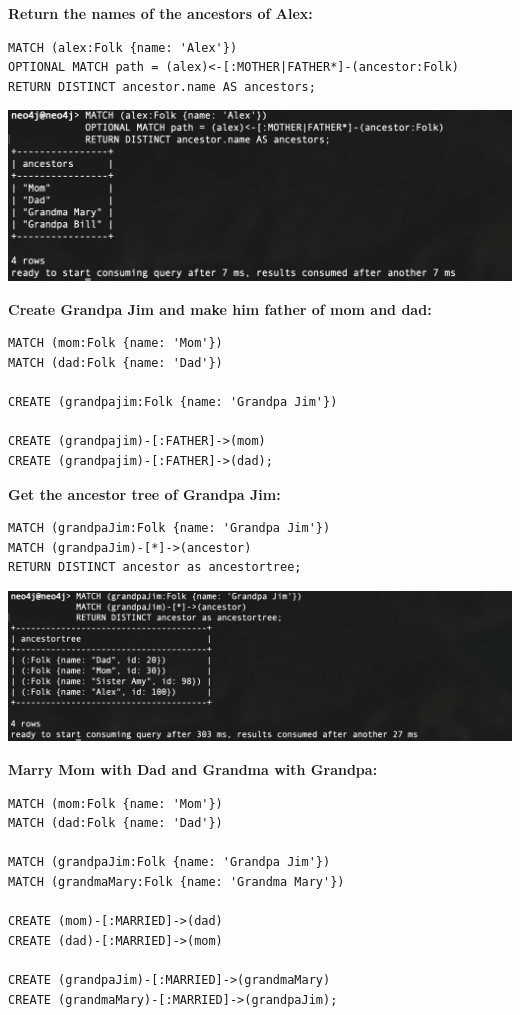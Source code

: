 \documentclass[14pt,a4paper]{extarticle}
\begin{document}
	\noindent \textbf{Return the names of the ancestors of Alex:}
	\begin{lstlisting}[style=sql]
MATCH (alex:Folk {name: 'Alex'})
OPTIONAL MATCH path = (alex)<-[:MOTHER|FATHER*]-(ancestor:Folk)
RETURN DISTINCT ancestor.name AS ancestors;
	\end{lstlisting}
	\includegraphics[width=\textwidth]{images/sc05.png}

	\noindent \textbf{Create Grandpa Jim and make him father of mom and dad:}
	\begin{lstlisting}[style=sql]
MATCH (mom:Folk {name: 'Mom'})
MATCH (dad:Folk {name: 'Dad'})

CREATE (grandpajim:Folk {name: 'Grandpa Jim'})

CREATE (grandpajim)-[:FATHER]->(mom)
CREATE (grandpajim)-[:FATHER]->(dad);
	\end{lstlisting}

	\pagebreak


	\noindent \textbf{Get the ancestor tree of Grandpa Jim:}
	\begin{lstlisting}[style=sql]
MATCH (grandpaJim:Folk {name: 'Grandpa Jim'})
MATCH (grandpaJim)-[*]->(ancestor)
RETURN DISTINCT ancestor as ancestortree;
	\end{lstlisting}
	\includegraphics[width=\textwidth]{images/sc06.png}

	\noindent \textbf{Marry Mom with Dad and Grandma with Grandpa:}
	\begin{lstlisting}[style=sql]
MATCH (mom:Folk {name: 'Mom'})
MATCH (dad:Folk {name: 'Dad'})

MATCH (grandpaJim:Folk {name: 'Grandpa Jim'})
MATCH (grandmaMary:Folk {name: 'Grandma Mary'})

CREATE (mom)-[:MARRIED]->(dad)
CREATE (dad)-[:MARRIED]->(mom)

CREATE (grandpaJim)-[:MARRIED]->(grandmaMary)
CREATE (grandmaMary)-[:MARRIED]->(grandpaJim);
	\end{lstlisting}
\end{document}
